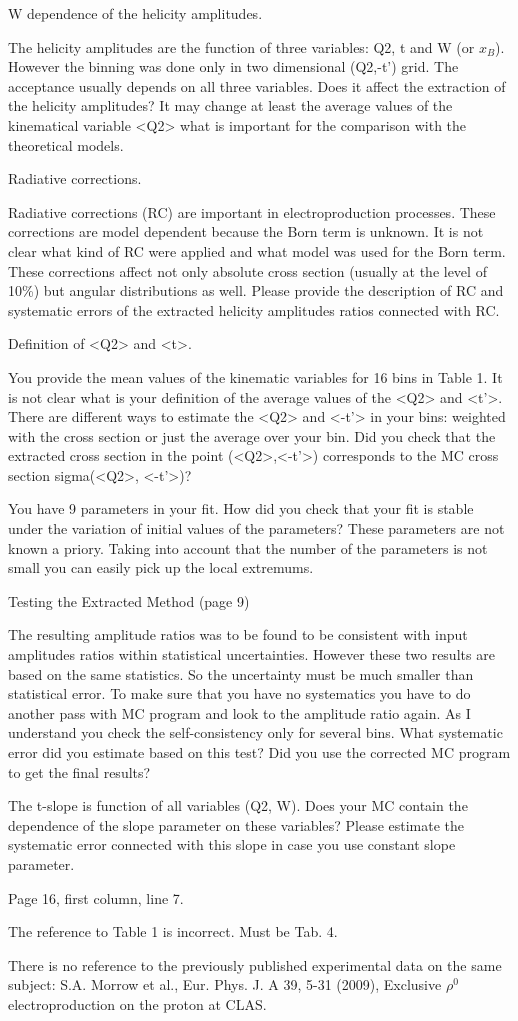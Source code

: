 \documentclass{article}
\begin{document}
W dependence of the helicity amplitudes.

The helicity amplitudes are the function of three variables: Q2, t and W (or $x_B$). However the binning was done only in two dimensional (Q2,-t') grid. The acceptance usually depends on all three variables. Does it affect the extraction of the helicity amplitudes? It may change at least the average values  of the kinematical variable <Q2> what is important for the comparison with the theoretical models.  

Radiative corrections.

Radiative corrections (RC) are important in electroproduction processes. These corrections are model dependent because the Born term is unknown. It is not clear what kind of RC were applied and what model was used for the Born term. These corrections affect not only absolute cross section (usually at the level of 10\%) but angular distributions as well. Please provide the description of RC and systematic errors of the extracted helicity amplitudes ratios connected with RC.

Definition of <Q2> and <t>.

You provide the mean values of the kinematic variables for 16 bins in Table 1. It is not clear
what is your definition of the average values of the <Q2> and <t'>. There are different ways to estimate  the <Q2> and <-t'> in your bins: weighted with the  cross section or just the average over your bin. Did you check that the extracted cross section in the point (<Q2>,<-t'>) corresponds to the MC cross section sigma(<Q2>, <-t'>)?  

You have 9 parameters in your fit. How did you check that your fit is stable under the variation of initial values of the parameters? These parameters are not known a priory. Taking into account that the number of the parameters is not small you can easily pick up the local extremums.  

Testing the Extracted Method (page 9)

The resulting amplitude ratios was to be found to be consistent with input amplitudes ratios within statistical uncertainties. However these two results are based on the same statistics. 
So the uncertainty must be much smaller than statistical error. To make sure that you have no systematics you have to do another pass with MC program and look to the amplitude ratio again. As I understand you check  the self-consistency only for several bins. What systematic error did you estimate based on this test?
Did you use the corrected MC program to get the final results?

The t-slope is function of all variables (Q2, W). Does your MC contain the dependence of the slope parameter on these variables? Please estimate the systematic error connected with this slope in case you use constant slope parameter.

Page 16, first column, line 7.

The reference to Table 1 is incorrect. Must be Tab. 4.

There is no reference to the previously published experimental data on the same subject:
S.A. Morrow et al., Eur. Phys. J. A 39, 5-31 (2009), Exclusive $\rho^0$ electroproduction on the proton at CLAS.
\end{document}
